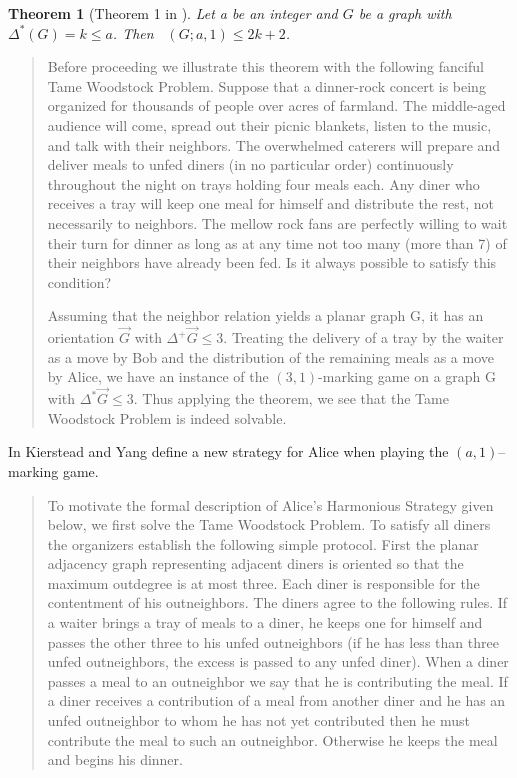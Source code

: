 \documentclass[11pt]{article}
\numberwithin{figure}{section}
\newtheorem{theorem}{Theorem}
\theoremstyle{definition}
\DeclareMathOperator{\col}{col_g}
\begin{document}
    \begin{theorem}[Theorem 1 in \cite{kierYang2005}]
        Let a be an integer and $G$ be a graph with $\Delta^*(G) = k\leq a$. Then
        $\col(G;a,1) \leq 2k + 2$.
    \end{theorem}
    \begin{quotation}
        Before proceeding we illustrate this theorem with the following fanciful Tame
        Woodstock Problem. Suppose that a dinner-rock concert is being organized for
        thousands of people over acres of farmland. The middle-aged audience will
        come, spread out their picnic blankets, listen to the music, and talk with their
        neighbors. The overwhelmed caterers will prepare and deliver meals to unfed
        diners (in no particular order) continuously throughout the night on trays holding
        four meals each. Any diner who receives a tray will keep one meal for himself
        and distribute the rest, not necessarily to neighbors. The mellow rock fans are
        perfectly willing to wait their turn for dinner as long as at any time not too many
        (more than 7) of their neighbors have already been fed. Is it always possible to
        satisfy this condition?
        
        Assuming that the neighbor relation yields a planar graph G, it has an
        orientation $\vec{G}$ with $\Delta^+\vec{G}\leq 3$. Treating the delivery of a tray by the waiter as a
        move by Bob and the distribution of the remaining meals as a move by Alice, we
        have an instance of the $(3, 1)$-marking game on a graph G with $\Delta^*\vec{G}\leq 3$. Thus
        applying the theorem, we see that the Tame Woodstock Problem is indeed
        solvable.
    \end{quotation}
    
    In \cite{kierYang2005} Kierstead and Yang define a new strategy for Alice when playing the  $(a,1)$--marking game.
    
    \begin{quotation}
        To motivate the formal description of Alice’s Harmonious Strategy given
        below, we first solve the Tame Woodstock Problem. To satisfy all diners the
        organizers establish the following simple protocol. First the planar adjacency
        graph representing adjacent diners is oriented so that the maximum outdegree is
        at most three. Each diner is responsible for the contentment of his outneighbors.
        The diners agree to the following rules. If a waiter brings a tray of meals to a
        diner, he keeps one for himself and passes the other three to his unfed
        outneighbors (if he has less than three unfed outneighbors, the excess is passed to
        any unfed diner). When a diner passes a meal to an outneighbor we say that he is
        contributing the meal. If a diner receives a contribution of a meal from another
        diner and he has an unfed outneighbor to whom he has not yet contributed then
        he must contribute the meal to such an outneighbor. Otherwise he keeps the meal
        and begins his dinner.
    \end{quotation}
    
\end{document}
